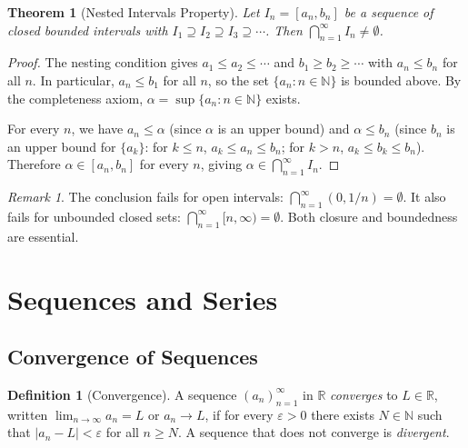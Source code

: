 \documentclass[11pt,a4paper]{article}
\theoremstyle{definition}
\newtheorem{definition}{Definition}[section]
\theoremstyle{plain}
\newtheorem{theorem}{Theorem}[section]
\theoremstyle{remark}
\newtheorem{remark}{Remark}[section]
\newcommand{\R}{\mathbb{R}}
\newcommand{\N}{\mathbb{N}}
\begin{document}
\begin{theorem}[Nested Intervals Property]
\label{thm:nested_intervals}
Let $I_n = [a_n, b_n]$ be a sequence of closed bounded intervals with
$I_1 \supseteq I_2 \supseteq I_3 \supseteq \cdots$. Then
$\bigcap_{n=1}^\infty I_n \neq \emptyset$.
\end{theorem}

\begin{proof}
The nesting condition gives $a_1 \le a_2 \le \cdots$ and
$b_1 \ge b_2 \ge \cdots$ with $a_n \le b_n$ for all $n$. In particular,
$a_n \le b_1$ for all $n$, so the set $\{a_n : n \in \N\}$ is bounded above.
By the completeness axiom, $\alpha = \sup\{a_n : n \in \N\}$ exists.

For every $n$, we have $a_n \le \alpha$ (since $\alpha$ is an upper bound) and
$\alpha \le b_n$ (since $b_n$ is an upper bound for $\{a_k\}$: for $k \le n$,
$a_k \le a_n \le b_n$; for $k > n$, $a_k \le b_k \le b_n$). Therefore
$\alpha \in [a_n, b_n]$ for every $n$, giving
$\alpha \in \bigcap_{n=1}^\infty I_n$.
\end{proof}

\begin{remark}
\label{rem:nested_open}
The conclusion fails for open intervals: $\bigcap_{n=1}^\infty (0, 1/n) = \emptyset$.
It also fails for unbounded closed sets: $\bigcap_{n=1}^\infty [n, \infty) = \emptyset$.
Both closure and boundedness are essential.
\end{remark}

\section{Sequences and Series}
\label{sec:sequences_series}

\subsection{Convergence of Sequences}
\label{subsec:seq_convergence}

\begin{definition}[Convergence]
\label{def:convergence}
A sequence $(a_n)_{n=1}^\infty$ in $\R$ \emph{converges} to $L \in \R$, written
$\lim_{n \to \infty} a_n = L$ or $a_n \to L$, if for every $\varepsilon > 0$
there exists $N \in \N$ such that $|a_n - L| < \varepsilon$ for all $n \ge N$.
A sequence that does not converge is \emph{divergent}.
\end{definition}
\end{document}
